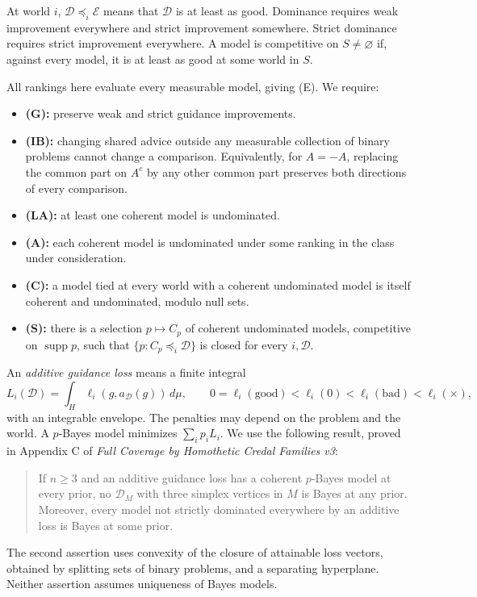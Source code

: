 \documentclass[11pt]{article}
\theoremstyle{remark}\newtheorem{remark}[theorem]{Remark}
\newcommand{\Dscr}{\mathcal D}
\newcommand{\Escr}{\mathcal E}
\newcommand{\supp}{\operatorname{supp}}
\begin{document}
At world $i$, $\Dscr\preceq_i\Escr$ means that $\Dscr$ is at least as good.
Dominance requires weak improvement everywhere and strict improvement
somewhere. Strict dominance requires strict improvement everywhere.
A model is competitive on $S\ne\varnothing$ if, against every model, it is
at least as good at some world in $S$.

All rankings here evaluate every measurable model, giving (E). We require:
\begin{itemize}[leftmargin=*,itemsep=3pt]
\item \textbf{(G):} preserve weak and strict guidance improvements.
\item \textbf{(IB):} changing shared advice outside any measurable collection
of binary problems cannot change a comparison. Equivalently, for $A=-A$,
replacing the common part on $A^c$ by any other common part preserves both
directions of every comparison.
\item \textbf{(LA):} at least one coherent model is undominated.
\item \textbf{(A):} each coherent model is undominated under some ranking
in the class under consideration.
\item \textbf{(C):} a model tied at every world with a coherent undominated
model is itself coherent and undominated, modulo null sets.
\item \textbf{(S):} there is a selection $p\mapsto C_p$ of coherent
undominated models, competitive on $\supp p$, such that
$\{p:C_p\preceq_i\Dscr\}$ is closed for every $i,\Dscr$.
\end{itemize}

An \emph{additive guidance loss} means a finite integral
\begin{equation}
 L_i(\Dscr)=\int_H\ell_i(g,a_\Dscr(g))\,d\mu,
 \qquad 0=\ell_i(\mathrm{good})<\ell_i(0)
 <\ell_i(\mathrm{bad})<\ell_i(\times),
 \label{eq:additive}
\end{equation}
with an integrable envelope. The penalties may depend on the problem and
the world. A $p$-Bayes model minimizes $\sum_i p_iL_i$.
We use the following result, proved in Appendix C of
\emph{Full Coverage by Homothetic Credal Families v3}:
\begin{quote}
If $n\ge3$ and an additive guidance loss has a coherent $p$-Bayes model
at every prior, no $\Dscr_M$ with three simplex vertices in $M$ is Bayes
at any prior. Moreover, every model not strictly dominated everywhere
by an additive loss is Bayes at some prior.
\end{quote}
The second assertion uses convexity of the closure of attainable loss
vectors, obtained by splitting sets of binary problems, and a separating
hyperplane. Neither assertion assumes uniqueness of Bayes models.
\end{document}
